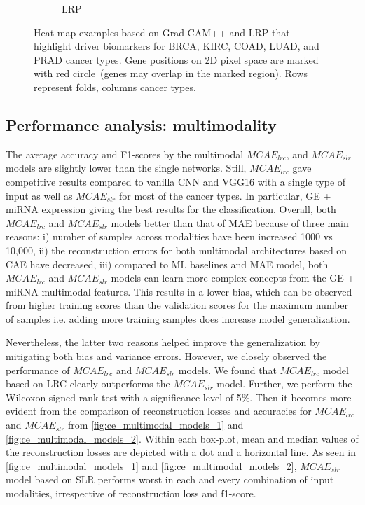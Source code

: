 \begin{figure}
\begin{subfigure}{0.48\linewidth}
		\caption{LRP}
        \label{fig:lrp}
	\end{subfigure}
	\caption[Heatmap example to mark driver biomarker for different cancer types]{Heat map examples based on Grad-CAM++ and LRP that highlight driver biomarkers for BRCA, KIRC, COAD, LUAD, and PRAD cancer types. Gene positions on 2D pixel space are marked with red circle~(genes may overlap in the marked region). Rows represent folds,  columns cancer types.} 
	\label{fig:hm_all}
	\vspace{-2mm}
\end{figure}

\subsection{Performance analysis: multimodality}
The average accuracy and F1-scores by the multimodal $MCAE_{lrc}$, and $MCAE_{slr}$ models are slightly lower than the single networks. Still, $MCAE_{lrc}$ gave competitive results compared to vanilla CNN and VGG16 with a single type of input as well as $MCAE_{slr}$ for most of the cancer types. 
In particular, GE + miRNA expression giving the best results for the classification.
Overall, both $MCAE_{lrc}$ and $MCAE_{slr}$ models better than that of MAE because of three main reasons: i) number of samples across modalities have been increased 1000 vs 10,000, ii) the reconstruction errors for both multimodal architectures based on CAE have decreased, iii) compared to ML baselines and MAE model, both $MCAE_{lrc}$ and $MCAE_{slr}$ models can learn more complex concepts from the GE + miRNA multimodal features. This results in a lower bias, which can be observed from higher training scores than the validation scores for the maximum number of samples i.e. adding more training samples does increase model generalization. 

\hspace*{3.5mm} Nevertheless, the latter two reasons helped improve the generalization by mitigating both bias and variance errors. However, we closely observed the performance of $MCAE_{lrc}$ and $MCAE_{slr}$ models. We found that $MCAE_{lrc}$ model based on LRC clearly outperforms the $MCAE_{slr}$ model. Further, we perform the Wilcoxon signed rank test with a significance level of 5\%. Then it becomes more evident from the comparison of reconstruction losses and accuracies for $MCAE_{lrc}$ and $MCAE_{slr}$ from \cref{fig:ce_multimodal_models_1} and \cref{fig:ce_multimodal_models_2}. Within each box-plot, mean and median values of the reconstruction losses are depicted with a dot and a horizontal line. As seen in \cref{fig:ce_multimodal_models_1} and \cref{fig:ce_multimodal_models_2}, $MCAE_{slr}$ model based on SLR performs worst in each and every combination of input modalities, irrespective of reconstruction loss and f1-score. 

